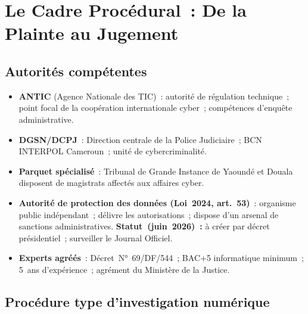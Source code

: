 \section{Le Cadre Procédural~: De la Plainte au Jugement}
\label{sec:procedure}

\subsection{Autorités compétentes}

\begin{itemize}
    \item \textbf{ANTIC} (Agence Nationale des TIC)~: autorité de régulation
          technique~; point focal de la coopération internationale cyber~;
          compétences d'enquête administrative.
    \item \textbf{DGSN/DCPJ}~: Direction centrale de la Police Judiciaire~;
          BCN INTERPOL Cameroun~; unité de cybercriminalité.
    \item \textbf{Parquet spécialisé}~: Tribunal de Grande Instance de Yaoundé
          et Douala disposent de magistrats affectés aux affaires cyber.
    \item \textbf{Autorité de protection des données (Loi~2024, art.~53)}~:
          organisme public indépendant~; délivre les autorisations~;
          dispose d'un arsenal de sanctions administratives.
          \textbf{Statut~(juin~2026)~:} à créer par décret présidentiel~;
          surveiller le Journal Officiel.
    \item \textbf{Experts agréés}~: Décret~N°~69/DF/544~; BAC+5 informatique
          minimum~; 5~ans d'expérience~; agrément du Ministère de la Justice.
\end{itemize}

\subsection{Procédure type d'investigation numérique}

